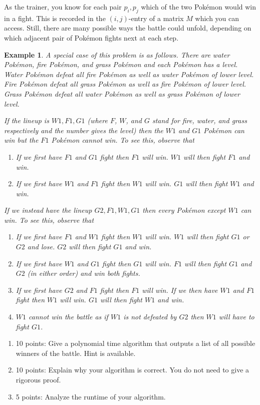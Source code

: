\documentclass[12pt]{article}
\newtheorem{example}[theorem]{Example}
\begin{document}
As the trainer, you know for each pair $p_i, p_j$ which of the two Pok\'emon would win in a fight. This is recorded in the $(i,j)$-entry of a matrix $M$ which you can access. Still, there are many possible ways the battle could unfold, depending on which adjacent pair of Pok\'{e}mon fights next at each step.

\begin{example}
A special case of this problem is as follows. There are water Pok\'{e}mon, fire Pok\'{e}mon, and grass Pok\'{e}mon and each Pok\'{e}mon has a level. Water Pok\'{e}mon defeat all fire Pok\'{e}mon as well as water Pok\'{e}mon of lower level. Fire Pok\'{e}mon defeat all grass Pok\'{e}mon as well as fire Pok\'{e}mon of lower level. Grass Pok\'{e}mon defeat all water Pok\'{e}mon as well as grass Pok\'{e}mon of lower level.

If the lineup is $W1,F1,G1$ (where $F$, $W$, and $G$ stand for fire, water, and grass respectively and the number gives the level) then the $W1$ and $G1$ Pok\'{e}mon can win but the $F1$ Pok\'{e}mon cannot win. To see this, observe that
\begin{enumerate}
\item If we first have $F1$ and $G1$ fight then $F1$ will win. $W1$ will then fight $F1$ and win.
\item If we first have $W1$ and $F1$ fight then $W1$ will win. $G1$ will then fight $W1$ and win.
\end{enumerate}

If we instead have the lineup $G2,F1,W1,G1$ then every Pok\'{e}mon except $W1$ can win. To see this, observe that 
\begin{enumerate}
\item If we first have $F1$ and $W1$ fight then $W1$ will win. $W1$ will then fight $G1$ or $G2$ and lose. $G2$ will then fight $G1$ and win.
\item If we first have $W1$ and $G1$ fight then $G1$ will win. $F1$ will then fight $G1$ and $G2$ (in either order) and win both fights.
\item If we first have $G2$ and $F1$ fight then $F1$ will win. If we then have $W1$ and $F1$ fight then $W1$ will win. $G1$ will then fight $W1$ and win.
\item $W1$ cannot win the battle as if $W1$ is not defeated by $G2$ then $W1$ will have to fight $G1$.
\end{enumerate}
\end{example}
\begin{enumerate}
\item[(a)] 10 points: Give a polynomial time algorithm that outputs a list of all possible winners of the battle. Hint is available.
\item[(b)] 10 points: Explain why your algorithm is correct. You do not need to give a rigorous proof.
\item[(c)] 5 points: Analyze the runtime of your algorithm.
\end{enumerate}
\newpage
\end{document}

